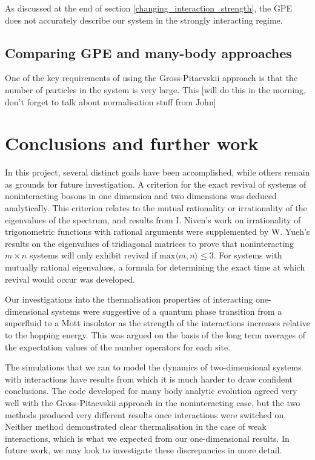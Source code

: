 \documentclass[a4paper, 10pt]{article}
\theoremstyle{plain}
\begin{document}
As discussed at the end of section \ref{changing_interaction_strength}, the 
GPE does not accurately describe our system in the strongly interacting regime.



\subsection{Comparing GPE and many-body approaches}
One of the key requirements of using the Gross-Pitaevskii approach is that
the number of particles in the system is very large. This [will do this in 
the morning, don't forget to talk about normalisation stuff from John]



\newpage
\section{Conclusions and further work}

In this project, several distinct goals have been accomplished, while others
remain as grounds for future investigation. A criterion for the exact revival
of systems of noninteracting bosons in one dimension and two dimensions was
deduced analytically. This criterion relates to the mutual rationality or 
irrationality of the eigenvalues of the spectrum, and results from I. Niven's
work on irrationality of trigonometric functions with rational arguments were
supplemented by W. Yueh's results on the eigenvalues of tridiagonal matrices
to prove that noninteracting $m\times n$ systems will only exhibit revival
if $\text{max}\langle m,n \rangle \leq 3$. For systems with mutually rational
eigenvalues, a formula for determining the exact time at which revival would
occur was developed. 

Our investigations into the thermalisation properties of interacting 
one-dimensional systems were suggestive of a quantum phase transition from a
superfluid to a Mott insulator as the strength of the interactions increases
relative to the hopping energy. This was argued on the basis of the long term
averages of the expectation values of the number operators for each site. 

The simulations that we ran to model the dynamics of two-dimensional systems 
with interactions have results from which it is much harder to draw confident 
conclusions. The code developed for many body analytic evolution agreed very
well with the Gross-Pitaevskii approach in the noninteracting case, but the
two methods produced very different results once interactions were switched on.
Neither method demonstrated clear thermalisation in the case of weak 
interactions, which is what we expected from our one-dimensional results. In 
future work, we may look to investigate these discrepancies in more detail.
\end{document}
